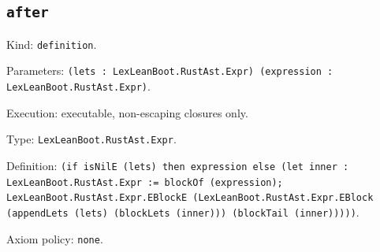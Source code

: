 \documentclass[11pt]{article}
\begin{document}
\subsection*{\texttt{after}}
\noindent Kind: \texttt{definition}.\par
\noindent Parameters: \texttt{(lets : LexLeanBoot.RustAst.Expr) (expression : LexLeanBoot.RustAst.Expr)}.\par
\noindent Execution: executable, non-escaping closures only.\par
\noindent Type: \texttt{LexLeanBoot.RustAst.Expr}.\par
\noindent Definition: \texttt{(if isNilE (lets) then expression else (let inner : LexLeanBoot.RustAst.Expr := blockOf (expression); LexLeanBoot.RustAst.Expr.EBlockE (LexLeanBoot.RustAst.Expr.EBlock (appendLets (lets) (blockLets (inner))) (blockTail (inner)))))}.\par
\noindent Axiom policy: \texttt{none}.\par
\end{document}
